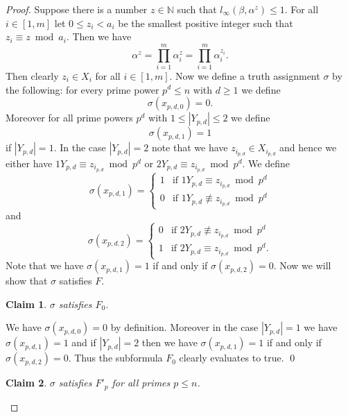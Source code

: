 \documentclass{article}
\newtheorem{claim}{Claim}
\begin{document}
\begin{proof}
Suppose there is a number $z \in \mathbb{N}$ such that $l_\infty(\beta, \alpha^z) \leq 1$. For all $i \in [1,m]$ let $0 \leq z_i < a_i$ be the smallest positive integer such that $z_i \equiv z \bmod a_i$. Then we have
\begin{displaymath}
\alpha^z = \prod_{i=1}^m \alpha_i^z = \prod_{i=1}^m \alpha_i^{z_i}.
\end{displaymath}
Then clearly $z_i \in X_i$ for all $i \in [1,m]$. Now we define a truth assignment $\sigma$ by the following: for every prime power $p^d \leq n$ with $d \geq 1$ we define
\begin{displaymath}
\sigma(x_{p,d,0}) = 0.
\end{displaymath}
Moreover for all prime powers $p^d$ with $1 \leq |Y_{p,d}| \leq 2$ we define
\begin{displaymath}
\sigma(x_{p,d,1}) = 1
\end{displaymath}
if $|Y_{p,d}| = 1$. In the case $|Y_{p,d}| = 2$ note that we have $z_{i_{p,d}} \in X_{i_{p,d}}$ and hence we either have $1Y_{p,d} \equiv z_{i_{p,d}} \bmod p^d$ or $2Y_{p,d} \equiv z_{i_{p,d}} \bmod p^d$. We define
\begin{displaymath}
\sigma(x_{p,d,1}) = \begin{cases}
1 & \text{if } 1Y_{p,d} \equiv z_{i_{p,d}} \bmod p^d\\
0 & \text{if } 1Y_{p,d} \not \equiv z_{i_{p,d}} \bmod p^d
\end{cases}
\end{displaymath}
and
\begin{displaymath}
\sigma(x_{p,d,2}) = \begin{cases}
0 & \text{if } 2Y_{p,d} \not \equiv z_{i_{p,d}} \bmod p^d\\
1 & \text{if } 2Y_{p,d} \equiv z_{i_{p,d}} \bmod p^d.
\end{cases}
\end{displaymath}
Note that we have $\sigma(x_{p,d,1}) = 1$ if and only if $\sigma(x_{p,d,2}) = 0$. Now we will show that $\sigma$ satisfies $F$.
\begin{claim}\label{claimsignmasatF0}
$\sigma$ satisfies $F_0$.
\end{claim}
We have $\sigma(x_{p,d,0}) = 0$ by definition. Moreover in the case $|Y_{p,d}| = 1$ we have $\sigma(x_{p,d,1}) = 1$ and if $|Y_{p,d}| = 2$ then we have $\sigma(x_{p,d,1}) = 1$ if and only if $\sigma(x_{p,d,2}) = 0$. Thus the subformula $F_0$ clearly evaluates to true.
\qed
\begin{claim}\label{claimsignmasatFp}
$\sigma$ satisfies $F'_p$ for all primes $p \leq n$.

\end{claim}
\end{proof}
\end{document}
